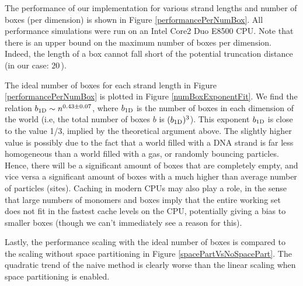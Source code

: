



The performance of our implementation for various strand lengths and number of boxes (per dimension) is shown in Figure \ref{performancePerNumBox}. All performance simulations were run on an Intel Core2 Duo E8500 CPU. Note that there is an upper bound on the maximum number of boxes per dimension. Indeed, the length of a box cannot fall short of the potential truncation distance (in our case: $20$\,\Angstrom).

The ideal number of boxes for each strand length in Figure \ref{performancePerNumBox} is plotted in Figure \ref{numBoxExponentFit}. We find the relation ${b_\text{1D}} \sim n^{0.43 \pm 0.07}$, where ${b_\text{1D}}$ is the number of boxes in each dimension of the world (i.e, the total number of boxes $b$ is $({b_\text{1D}})^3$).
This exponent ${b_\text{1D}}$ is close to the value 1/3, implied by the theoretical argument above. The slightly higher value is possibly due to the fact that a world filled with a DNA strand is far less homogeneous than a world filled with a gas, or randomly bouncing particles.
Hence, there will be a significant amount of boxes that are completely empty, and vice versa a significant amount of boxes with a much higher than average number of particles (sites).
Caching in modern CPUs may also play a role, in the sense that large numbers of monomers and boxes imply that the entire working set does not fit in the fastest cache levels on the CPU, potentially giving a bias to smaller boxes (though we can't immediately see a reason for this).

Lastly, the performance scaling with the ideal number of boxes is compared to the scaling without space partitioning in Figure \ref{spacePartVsNoSpacePart}. The quadratic trend of the naive method is clearly worse than the linear scaling when space partitioning is enabled.

